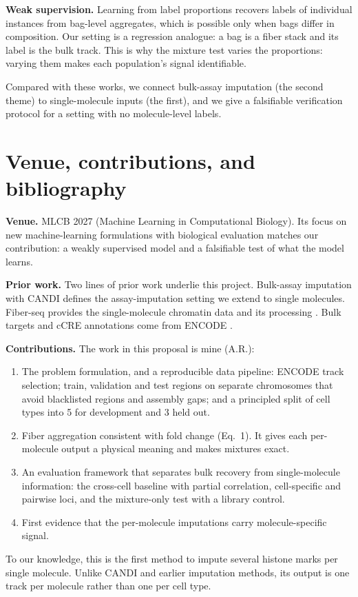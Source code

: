 \documentclass[acmtog]{acmart}
\begin{document}
\textbf{Weak supervision.} Learning from label proportions \citep{Quadrianto09} recovers labels of individual instances from bag-level aggregates, which is possible only when bags differ in composition. Our setting is a regression analogue: a bag is a fiber stack and its label is the bulk track. This is why the mixture test varies the proportions: varying them makes each population's signal identifiable.

Compared with these works, we connect bulk-assay imputation (the second theme) to single-molecule inputs (the first), and we give a falsifiable verification protocol for a setting with no molecule-level labels.

\section{Venue, contributions, and bibliography}

\textbf{Venue.} MLCB 2027 (Machine Learning in Computational Biology). Its focus on new machine-learning formulations with biological evaluation matches our contribution: a weakly supervised model and a falsifiable test of what the model learns.

\textbf{Prior work.} Two lines of prior work underlie this project. Bulk-assay imputation with CANDI \citep{Foroozandeh25} defines the assay-imputation setting we extend to single molecules. Fiber-seq \citep{Stergachis20} provides the single-molecule chromatin data and its processing \citep{Jha24}. Bulk targets and cCRE annotations come from ENCODE \citep{ENCODE20}.

\textbf{Contributions.} The work in this proposal is mine (A.R.):
\begin{enumerate}
  \item The problem formulation, and a reproducible data pipeline: ENCODE track selection; train, validation and test regions on separate chromosomes that avoid blacklisted regions and assembly gaps; and a principled split of cell types into 5 for development and 3 held out.
  \item Fiber aggregation consistent with fold change (Eq.~1). It gives each per-molecule output a physical meaning and makes mixtures exact.
  \item An evaluation framework that separates bulk recovery from single-molecule information: the cross-cell baseline with partial correlation, cell-specific and pairwise loci, and the mixture-only test with a library control.
  \item First evidence that the per-molecule imputations carry molecule-specific signal.
\end{enumerate}
To our knowledge, this is the first method to impute several histone marks per single molecule. Unlike CANDI and earlier imputation methods, its output is one track per molecule rather than one per cell type.



\end{document}
